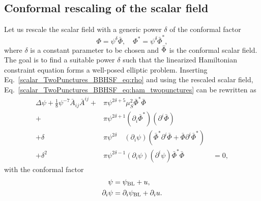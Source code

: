 \subsection{Conformal rescaling of the scalar field}
Let us rescale the scalar field with a generic power $\delta$ of the conformal factor
\begin{equation}
    \Phi = \psi^\delta \bar{\Phi},
    \quad
    \Phi^* = \psi^\delta \bar{\Phi}^*,
\end{equation}
where $\delta$ is a constant parameter to be chosen
and $\Bar{\Phi}$ is the conformal scalar field.
The goal is to find a suitable power $\delta$ such that the linearized Hamiltonian
constraint equation forms a well-posed elliptic problem.
Inserting Eq.~\eqref{scalar_TwoPunctures_BBHSF_eq:rho}
and using the rescaled scalar field,
Eq.~\eqref{scalar_TwoPunctures_BBHSF_eq:ham_twopunctures} can be rewritten as
\begin{align}
    \Delta\psi
    + \frac{1}{8} \psi^{-7} \bar{A}_{ij} \bar{A}^{ij}
    +
    &\pi \psi^{2\delta + 5}
    \mu_S^2 \bar{\Phi}^* \bar{\Phi}
    \nonumber
    \\
    +
    &\pi \psi^{2\delta + 1}
    (\partial_i\bar{\Phi}^*)
    (\partial^i\bar{\Phi})
    \nonumber
    \\
    + \delta
    &\pi \psi^{2\delta}\quad
    (\partial_i\psi)
    ( \bar{\Phi}^* \partial^i\bar{\Phi}
    + \bar{\Phi} \partial^i\bar{\Phi}^* )
    \nonumber
    \\
    + \delta^2
    &\pi \psi^{2\delta-1} (\partial_i\psi) (\partial^i\psi)
    \bar{\Phi}^* \bar{\Phi}
    \quad\quad\quad\quad
    = 0,
    \label{scalar_TwoPunctures_BBHSF_eq:nonlin_ham_eq}
\end{align}
with the conformal factor
\begin{align}
    \psi 
    &= \psi_{\rm BL} + u,
    \\
    \partial_i\psi 
    &= \partial_i\psi_{\rm BL} + \partial_i u.
\end{align}

